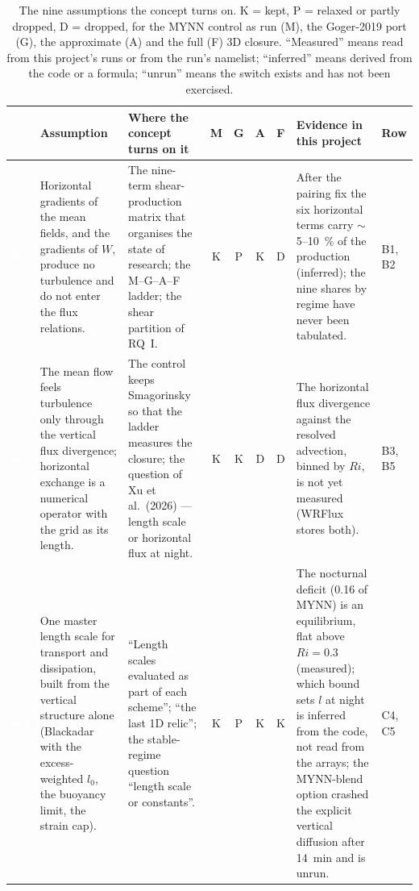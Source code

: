 \documentclass[10pt,a4paper]{article}
\newcommand{\keytag}[1]{\colorbox{keyc}{\textcolor{white}{\sffamily\bfseries\scriptsize K#1}}}
\begin{document}
\begin{table}[!t]
\centering
\caption{The nine assumptions the concept turns on. K = kept, P = relaxed or partly dropped, D = dropped, for the MYNN control as run (M), the Goger-2019 port (G), the approximate (A) and the full (F) 3D closure. ``Measured'' means read from this project's runs or from the run's namelist; ``inferred'' means derived from the code or a formula; ``unrun'' means the switch exists and has not been exercised.}
\label{tab:keys}
\footnotesize
\setlength{\tabcolsep}{4pt}
\renewcommand{\arraystretch}{1.12}
\begin{tabularx}{\textwidth}{@{}l >{\raggedright\arraybackslash}p{3.9cm} >{\raggedright\arraybackslash}X c@{\,}c@{\,}c@{\,}c >{\raggedright\arraybackslash}X l@{}}
\toprule
 & Assumption & Where the concept turns on it & M & G & A & F & Evidence in this project & Row \\
\midrule
\keytag{1} & Horizontal gradients of the mean fields, and the gradients of $W$, produce no turbulence and do not enter the flux relations. & The nine-term shear-production matrix that organises the state of research; the M--G--A--F ladder; the shear partition of RQ~I. & K & P & K & D & After the pairing fix the six horizontal terms carry $\sim$5--10~\% of the production (inferred); the nine shares by regime have never been tabulated. & B1, B2 \\
\addlinespace[2pt]
\keytag{2} & The mean flow feels turbulence only through the vertical flux divergence; horizontal exchange is a numerical operator with the grid as its length. & The control keeps Smagorinsky so that the ladder measures the closure; the question of Xu et al.\ (2026) — length scale or horizontal flux at night. & K & K & D & D & The horizontal flux divergence against the resolved advection, binned by $Ri$, is not yet measured (WRFlux stores both). & B3, B5 \\
\addlinespace[2pt]
\keytag{3} & One master length scale for transport and dissipation, built from the vertical structure alone (Blackadar with the excess-weighted $l_0$, the buoyancy limit, the strain cap). & ``Length scales evaluated as part of each scheme''; ``the last 1D relic''; the stable-regime question ``length scale or constants''. & K & P & K & K & The nocturnal deficit (0.16 of MYNN) is an equilibrium, flat above $Ri = 0.3$ (measured); which bound sets $l$ at night is inferred from the code, not read from the arrays; the MYNN-blend option crashed the explicit vertical diffusion after 14~min and is unrun. & C4, C5 \\

\end{tabularx}
\end{table}
\end{document}
